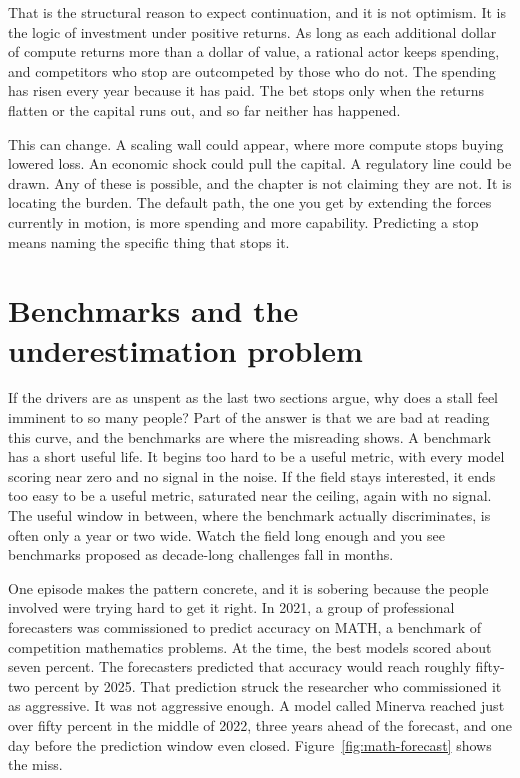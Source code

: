 That is the structural reason to expect continuation, and it is not optimism. It is the logic of investment under positive returns. As long as each additional dollar of compute returns more than a dollar of value, a rational actor keeps spending, and competitors who stop are outcompeted by those who do not. The spending has risen every year because it has paid. The bet stops only when the returns flatten or the capital runs out, and so far neither has happened.

This can change. A scaling wall could appear, where more compute stops buying lowered loss. An economic shock could pull the capital. A regulatory line could be drawn. Any of these is possible, and the chapter is not claiming they are not. It is locating the burden. The default path, the one you get by extending the forces currently in motion, is more spending and more capability. Predicting a stop means naming the specific thing that stops it.

\section*{Benchmarks and the underestimation problem}

If the drivers are as unspent as the last two sections argue, why does a stall feel imminent to so many people? Part of the answer is that we are bad at reading this curve, and the benchmarks are where the misreading shows. A benchmark has a short useful life. It begins too hard to be a useful metric, with every model scoring near zero and no signal in the noise. If the field stays interested, it ends too easy to be a useful metric, saturated near the ceiling, again with no signal. The useful window in between, where the benchmark actually discriminates, is often only a year or two wide. Watch the field long enough and you see benchmarks proposed as decade-long challenges fall in months.

One episode makes the pattern concrete, and it is sobering because the people involved were trying hard to get it right. In 2021, a group of professional forecasters was commissioned to predict accuracy on MATH, a benchmark of competition mathematics problems. At the time, the best models scored about seven percent. The forecasters predicted that accuracy would reach roughly fifty-two percent by 2025. That prediction struck the researcher who commissioned it as aggressive. It was not aggressive enough. A model called Minerva reached just over fifty percent in the middle of 2022, three years ahead of the forecast, and one day before the prediction window even closed. Figure~\ref{fig:math-forecast} shows the miss.

